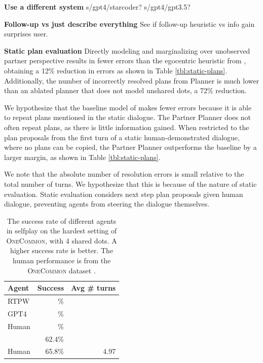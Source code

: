 \documentclass[11pt]{article}
\newcommand{\system}{RTPW}
\begin{document}
\textbf{Use a different system}
s/gpt4/starcoder?
s/gpt4/gpt3.5?

\textbf{Follow-up vs just describe everything}
See if follow-up heuristic vs info gain surprises user.

\textbf{Static plan evaluation}
Directly modeling and marginalizing over unobserved partner perspective results in fewer
errors than the egocentric heuristic from \citet{fried}, obtaining a 12\% reduction in errors as shown in Table \ref{tbl:static-plans}.
Additionally, the number of incorrectly resolved plans from Planner is much lower than an ablated planner that does not model unshared dots, a 72\% reduction.

We hypothesize that the baseline model of \citet{fried} makes fewer errors because it is able to repeat plans mentioned in the static dialogue.
The Partner Planner does not often repeat plans, as there is little information gained.
When restricted to the plan proposals from the first turn of a static human-demonstrated dialogue, where no plans can be copied, the Partner Planner outperforms the baseline by a larger margin, as shown in Table \ref{tbl:static-plans}.

We note that the absolute number of resolution errors is small relative to the total number of turns.
We hypothesize that this is because of the nature of static evaluation.
Static evaluation considers next step plan proposals given human dialogue,
preventing agents from steering the dialogue themselves.

\begin{table}[!t]
\centering
\begin{tabular}{lrr}
\toprule
Agent                   & Success & Avg \# turns\\
\midrule
\system{}               & \%        & \\
GPT4                    & \%  & \\
Human                   & \%  & \\
\citet{fried}           & 62.4\%  & \\
Human                   & 65.8\%  & 4.97\\
\bottomrule
\end{tabular}
\caption{\label{tbl:selfplay}
The success rate of different agents in selfplay on the hardest setting of \textsc{OneCommon}, with 4 shared dots.
A higher success rate is better.
The human performance is from the \textsc{OneCommon} dataset
\citep{onecommon}.
}
\end{table}
\end{document}
